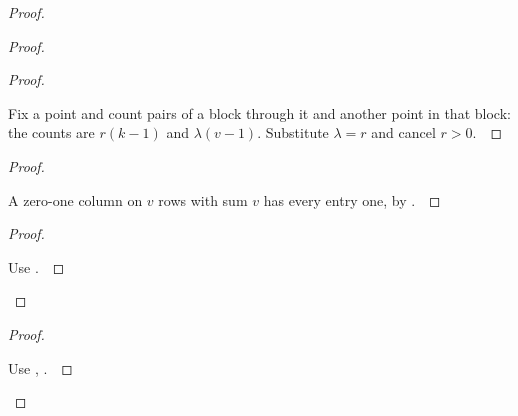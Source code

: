 \documentclass[11pt]{amsart}
\let\qed\relax
\theoremstyle{definition}
\begin{document}
\begin{proof}
\begin{proof}
\begin{proof}
\pf\ \raggedright Fix a point and count pairs of a block through it and another point in that block: the counts are $r(k-1)$ and $\lambda(v-1)$. Substitute $\lambda=r$ and cancel $r>0$.~\qed
\end{proof}
\begin{proof}
\pf\ \raggedright A zero-one column on $v$ rows with sum $v$ has every entry one, by .~\qed
\end{proof}
\qedstep
\begin{proof}
\pf\ \raggedright Use .~\qed
\end{proof}
\end{proof}
\qedstep
\begin{proof}
\pf\ \raggedright Use , .~\qed
\end{proof}
\end{proof}
\end{document}
